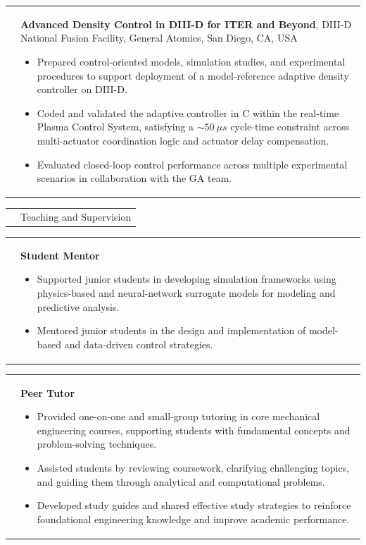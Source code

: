 \documentclass[11pt,letterpaper]{article}
\makeatletter
\newcommand{\CVSection}[1]{%
  \vspace{0.4em}
  \noindent
  \begin{tabularx}{\textwidth}{@{}p{0.82in}@{\hspace{0.14in}}X@{}}
    \raisebox{-1.45ex}{\color{rulecolor}\rule{0.82in}{4.2pt}} &
    {\fontsize{14}{16}\selectfont\color{cvcolor}#1}\\
  \end{tabularx}
  \vspace{0.55em}
}
\newcommand{\CVItem}[2]{%
  \begin{tabularx}{\textwidth}{@{}p{0.83in}@{\hspace{0.15in}}X@{}}
    \raggedleft{#1} & #2\\[3pt]
  \end{tabularx}
}
\makeatother
\begin{document}
\CVItem{\vspace{-2.75mm}June 2025}{\textbf{Advanced Density Control in DIII-D for ITER and Beyond}, DIII-D National Fusion Facility, General Atomics, San Diego, CA, USA
  \begin{itemize}
     \item Prepared control-oriented models, simulation studies, and experimental procedures to support deployment of a model-reference adaptive density controller on DIII-D.
     \item Coded and validated the adaptive controller in C within the real-time Plasma Control System, satisfying a ${\sim}50~\mu s$ cycle-time constraint across multi-actuator coordination logic and actuator delay compensation.
     \item Evaluated closed-loop control performance across multiple experimental scenarios in collaboration with the GA team.
  \end{itemize}
}
\CVSection{Teaching and Supervision}

\CVItem{\hspace{-5mm}\mbox{2021--Ongoing}}{%
  \textbf{Student Mentor} 
  \begin{itemize}
    \item Supported junior students in developing simulation frameworks using physics-based and neural-network surrogate models for modeling and predictive analysis.
    \item Mentored junior students in the design and implementation of model-based and data-driven control strategies.
  \end{itemize}
}
\CVItem{2020--2021}{\textbf{Peer Tutor} \begin{itemize}
  \item Provided one-on-one and small-group tutoring in core mechanical engineering courses, supporting students with fundamental concepts and problem-solving techniques.
  \item Assisted students by reviewing coursework, clarifying challenging topics, and guiding them through analytical and computational problems.
  \item Developed study guides and shared effective study strategies to reinforce foundational engineering knowledge and improve academic performance.
\end{itemize}}
\end{document}
